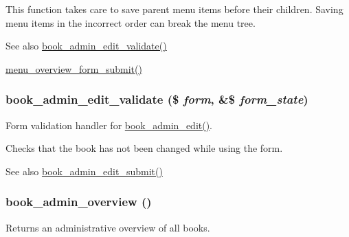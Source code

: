 This function takes care to save parent menu items before their children. Saving menu items in the incorrect order can break the menu tree.

\begin{DoxySeeAlso}{See also}
\hyperlink{book_8admin_8inc_ae92ff3db1b9b0f3a9832e1db72d5faec}{book\_\-admin\_\-edit\_\-validate()} 

\hyperlink{menu_8admin_8inc_aa16576d9e19529ee9f710dc3b5f5b810}{menu\_\-overview\_\-form\_\-submit()} 
\end{DoxySeeAlso}
\hypertarget{book_8admin_8inc_ae92ff3db1b9b0f3a9832e1db72d5faec}{
\subsubsection[{book\_\-admin\_\-edit\_\-validate}]{\setlength{\rightskip}{0pt plus 5cm}book\_\-admin\_\-edit\_\-validate (\$ {\em form}, \/  \&\$ {\em form\_\-state})}}
\label{book_8admin_8inc_ae92ff3db1b9b0f3a9832e1db72d5faec}
Form validation handler for \hyperlink{group__forms_gac3a5a2ff41875baa73d6af357cf328e6}{book\_\-admin\_\-edit()}.

Checks that the book has not been changed while using the form.

\begin{DoxySeeAlso}{See also}
\hyperlink{book_8admin_8inc_af0fb9b52db15bf3bc44c63d5b9042c69}{book\_\-admin\_\-edit\_\-submit()} 
\end{DoxySeeAlso}
\hypertarget{book_8admin_8inc_a8157d71732b3c171a9328b73059f2716}{
\subsubsection[{book\_\-admin\_\-overview}]{\setlength{\rightskip}{0pt plus 5cm}book\_\-admin\_\-overview ()}}
\label{book_8admin_8inc_a8157d71732b3c171a9328b73059f2716}
Returns an administrative overview of all books.

